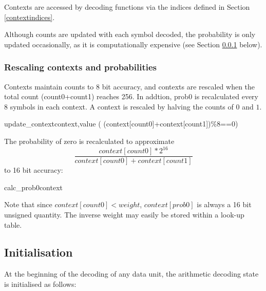 Contexts are accessed by decoding functions
via the indices defined in Section \ref{contextindices}. 

Although counts are updated with each symbol decoded, the probability is only updated occasionally, as it is computationally
expensive (see Section \ref{rescalecontext} below).

\subsubsection{Rescaling contexts and probabilities}
\label{rescalecontext}

Contexts maintain counts to 8 bit accuracy, and contexts are rescaled when the total count (count0+count1) reaches 256. In addtion, prob0 is recalculated every
8 symbols in each context. A context is rescaled by halving the counts of $0$ and $1$.

\begin{pseudo}{update\_context}{context,value}
\bsELSE
\bsEND
\bsIF( (context[count0]+context[count1])\%8==0)
    \bsEND
\bsEND
\end{pseudo}

The probability of zero is recalculated to approximate
\[ \frac{context[count0]*2^{16}}{context[count0]+context[count1]}\]
to 16 bit accuracy:

\begin{pseudo}{calc\_prob0}{context}
\end{pseudo}

\begin{informative}
Note that since $context[count0]<weight$, $context[prob0]$ is always a 16 bit unsigned quantity.
The inverse weight may easily be stored within a look-up table.
\end{informative}

\subsection{Initialisation}
\label{initarith}

At the beginning of the decoding of any data unit, the arithmetic
decoding state is initialised as follows:

